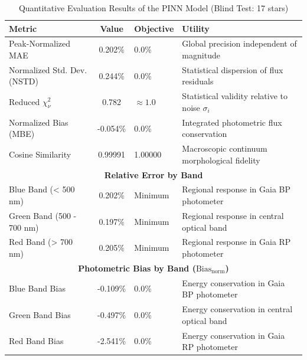 
\begin{table}[htpb]
\centering
\caption{Quantitative Evaluation Results of the PINN Model (Blind Test: 17 stars)}
\label{tab:pinn_evaluation}
\begin{tabular}{lcll}
\hline
\textbf{Metric} & \textbf{Value} & \textbf{Objective} & \textbf{Utility} \\
\hline
Peak-Normalized MAE & 0.202\% & 0.0\% & Global precision independent of magnitude \\
Normalized Std. Dev. (NSTD) & 0.244\% & 0.0\% & Statistical dispersion of flux residuals \\
Reduced $\chi^2_\nu$ & 0.782 & $\approx 1.0$ & Statistical validity relative to noise $\sigma_i$ \\
Normalized Bias (MBE) & -0.054\% & 0.0\% & Integrated photometric flux conservation \\
Cosine Similarity & 0.99991 & 1.00000 & Macroscopic continuum morphological fidelity \\
\hline
\multicolumn{4}{c}{\textbf{Relative Error by Band}} \\
\hline
Blue Band (< 500 nm) & 0.202\% & Minimum & Regional response in Gaia BP photometer \\
Green Band (500 - 700 nm) & 0.197\% & Minimum & Regional response in central optical band \\
Red Band (> 700 nm) & 0.205\% & Minimum & Regional response in Gaia RP photometer \\
\hline
\multicolumn{4}{c}{\textbf{Photometric Bias by Band ($\text{Bias}_{\text{norm}}$)}} \\
\hline
Blue Band Bias & -0.109\% & 0.0\% & Energy conservation in Gaia BP photometer \\
Green Band Bias & -0.497\% & 0.0\% & Energy conservation in central optical band \\
Red Band Bias & -2.541\% & 0.0\% & Energy conservation in Gaia RP photometer \\
\hline
\end{tabular}
\end{table}
